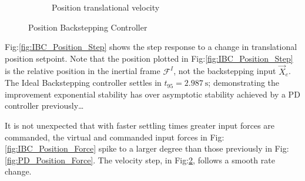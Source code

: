 \begin{figure}[hbtp]
\begin{subfigure}{0.49\textwidth}
\caption{Position translational velocity}
\label{fig:IBC_Position_Velocity}
\end{subfigure}
\vspace{-6pt}
\caption{Position Backstepping Controller}
\vspace{-8pt}
\end{figure}
\par
Fig:\ref{fig:IBC_Position_Step} shows the step response to a change in translational position setpoint. Note that the position plotted in Fig:\ref{fig:IBC_Position_Step} is the relative position in the inertial frame $\mathcal{F}^{I}$, not the backstepping input $\vec{X}_e$. The Ideal Backstepping controller settles in $t_{95}=2.987~\text{s}$; demonstrating the improvement exponential stability has over asymptotic stability achieved by a PD controller previously\ldots
\par
It is not unexpected that with faster settling times greater input forces are commanded, the virtual and commanded input forces in Fig:\ref{fig:IBC_Position_Force} spike to a larger degree than those previously in Fig:\ref{fig:PD_Position_Force}. The velocity step, in Fig:\ref{fig:IBC_Position_Velocity}, follows a smooth rate change.
